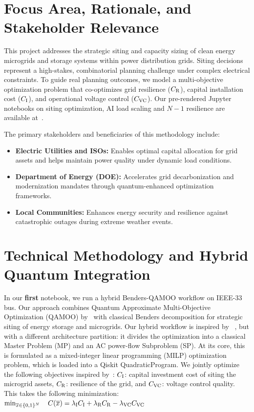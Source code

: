 \documentclass[11pt]{article}
\begin{document}


\section{Focus Area, Rationale, and Stakeholder Relevance}
This project addresses the strategic siting and capacity sizing of clean energy microgrids and storage systems within power distribution grids. Siting decisions represent a high-stakes, combinatorial planning challenge under complex electrical constraints. To guide real planning outcomes, we model a multi-objective optimization problem that co-optimizes grid resilience ($C_{\rm R}$), capital installation cost ($C_{\rm I}$), and operational voltage control ($C_{\rm VC}$). Our pre-rendered Jupyter notebooks on siting optimization, AI load scaling and $N-1$ resilience are available at~\cite{doe_notebook1, doe_notebook2}.

The primary stakeholders and beneficiaries of this methodology include:
\begin{itemize}[leftmargin=*,noitemsep,topsep=0pt]
  \item \textbf{Electric Utilities and ISOs:} Enables optimal capital allocation for grid assets and helps maintain power quality under dynamic load conditions.
  \item \textbf{Department of Energy (DOE):} Accelerates grid decarbonization and modernization mandates through quantum-enhanced optimization frameworks.
  \item \textbf{Local Communities:} Enhances energy security and resilience against catastrophic outages during extreme weather events.
\end{itemize}

\section{Technical Methodology and Hybrid Quantum Integration}
In our \textbf{first} notebook, we run a hybrid Benders-QAMOO workflow on IEEE-33 bus. Our approach combines Quantum Approximate Multi-Objective Optimization (QAMOO) by~\cite{qamoo2025} with classical Benders decomposition for strategic siting of energy storage and microgrids. Our hybrid workflow is inspired by ~\cite{pasqal2024}, but with a different architecture partition: it divides the optimization into a classical Master Problem (MP) and an AC power-flow Subproblem (SP).
At its core, this is formulated as a mixed-integer linear programming (MILP) optimization problem, which is loaded into a Qiskit QuadraticProgram. We jointly optimize the following objectives inspired by~\cite{multiverse2023}: $C_{\rm I}$: capital investment cost of siting the microgrid assets, $C_{\rm R}$: resilience of the grid, and $C_{\rm VC}$: voltage control quality. This takes the following minimization:
$
\min_{\overline{x} \in \{0,1\}^N} \quad C(\overline{x}) = \lambda_{\rm I} C_{\rm I} + \lambda_{\rm R} C_{\rm R} - \lambda_{\rm VC} C_{\rm VC}
$
\end{document}
